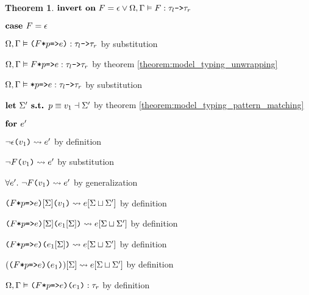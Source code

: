 \documentclass[acmsmall]{acmart}
\theoremstyle{definition}
\newtheorem{theorem}{Theorem}[section]
\begin{document}
\begin{theorem}
  \item \Z\Z\Z $\B{invert on}\ F = \epsilon \lor \Omega, \Gamma \satisfies F \hastype \tau_l \code{->} \tau_r$
  \item \Z\Z\Z $\textbf{case } F = \epsilon$ 
  \item \Z\Z\Z\Z $\Omega, \Gamma \vDash \texttt{($F$*$p$=>$e$)} : \tau_l \texttt{->} \tau_r$ by substitution 
  \item \Z\Z\Z\Z $\Omega, \Gamma \vDash \texttt{$F$*$p$=>$e$} : \tau_l \texttt{->} \tau_r$ by theorem \ref{theorem:model_typing_unwrapping} 
  \item \Z\Z\Z\Z $\Omega, \Gamma \vDash \texttt{*$p$=>$e$} : \tau_l \texttt{->} \tau_r$ by substitution 
  \item \Z\Z\Z\Z $\textbf{let}\ \Sigma' \textbf{ s.t. } p \equiv v_1 \dashv \Sigma'$ 
    by theorem \ref{theorem:model_typing_pattern_matching} 
  \item \Z\Z\Z\Z $\textbf{for } e'$ 
  \item \Z\Z\Z\Z\Z $\neg \epsilon\texttt{($v_1$)} \rightsquigarrow e'$ by definition
  \item \Z\Z\Z\Z\Z $\neg F\texttt{($v_1$)} \rightsquigarrow e'$ by substitution 
  \item \Z\Z\Z\Z $\forall e' .\ \neg F\texttt{($v_1$)} \rightsquigarrow e'$ by generalization 
  \item \Z\Z\Z\Z $\texttt{($F$*$p$=>$e$)$[\Sigma]$($v_1$)} \rightsquigarrow e[\Sigma \sqcup \Sigma']$ by definition 
  \item \Z\Z\Z\Z $\texttt{($F$*$p$=>$e$)$[\Sigma]$($e_1[\Sigma]$)} \rightsquigarrow e[\Sigma \sqcup \Sigma']$ by definition  
  \item \Z\Z\Z\Z $\texttt{($F$*$p$=>$e$)($e_1[\Sigma]$)} \rightsquigarrow e[\Sigma \sqcup \Sigma']$ by definition  
  \item \Z\Z\Z\Z $(\texttt{($F$*$p$=>$e$)($e_1$)})[\Sigma] \rightsquigarrow e[\Sigma \sqcup \Sigma']$ by definition  
  \item \Z\Z\Z\Z $\Omega, \Gamma \vDash \texttt{($F$*$p$=>$e$)($e_1$)} : \tau_r$ by definition


\end{theorem}
\end{document}

